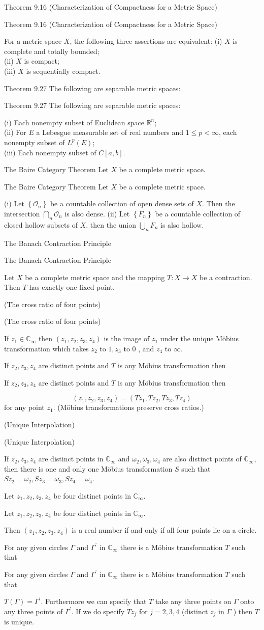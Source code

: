 \documentclass[17pt]{extarticle}
\newcommand{\boxset}[2]{\begin{mdframed}[style=darkQuesion]
#1
\end{mdframed}
\newpage
\begin{mdframed}[style=darkQuesion]
#1
  \end{mdframed}
\begin{mdframed}[style=darkAnswer]
#2
  \end{mdframed}
  \newpage
}
\begin{document}
\boxset{Theorem 9.16 (Characterization of Compactness for a Metric Space)}
{For a metric space $X$, the following three assertions are equivalent:
(i) $X$ is complete and totally bounded;\[\ \]
(ii) $X$ is compact;\[\ \]
(iii) $X$ is sequentially compact.\[\ \]
}%
\boxset{Theorem $9.27$ The following are separable metric spaces:}
{
(i) Each nonempty subset of Euclidean space $\mathbb{R}^{n}$;\[\ \]
(ii) For $E$ a Lebesgue measurable set of real numbers and $1 \leq p<\infty$, each nonempty subset of $L^{p}(E)$;\[\ \]
(iii) Each nonempty subset of $C[a, b]$.\[\ \]
}%
\boxset{The Baire Category Theorem Let $X$ be a complete metric space.}
{
(i) Let $\left\{\mathcal{O}_{n}\right\}$ be a countable collection of open dense sets of $X$. Then the intersection $\bigcap_{n} \mathcal{O}_{n}$ is also dense.
(ii) Let $\left\{F_{n}\right\}$ be a countable collection of closed hollow subsets of $X$. then the union $\bigcup_{n} F_{n}$ is also hollow.\[\ \]
}%
\boxset{The Banach Contraction Principle}
{Let $X$ be a complete metric space and the mapping $T: X \rightarrow X$ be a contraction. Then $T$ has exactly one fixed point.}%
\boxset{(The cross ratio of four points)}
{If $z_{1} \in \mathbb{C}_{\infty}$ then $\left(z_{1}, z_{2}, z_{3}, z_{4}\right)$ is the image of $z_{1}$ under the unique Möbius transformation which takes $z_{2}$ to $1, z_{3}$ to 0 , and $z_{4}$ to $\infty$.}%
\boxset{If $z_{2}, z_{3}, z_{4}$ are distinct points and $T$ is any Möbius transformation then}
{
\[
\left(z_{1}, z_{2}, z_{3}, z_{4}\right)=\left(T z_{1}, T z_{2}, T z_{3}, T z_{4}\right)
\]
for any point $z_{1}$. (Möbius transformations preserve cross ratios.)
}%
\boxset{(Unique Interpolation)}
{If $z_{2}, z_{3}, z_{4}$ are distinct points in $\mathbb{C}_{\infty}$ and $\omega_{2}, \omega_{3}, \omega_{4}$ are also distinct points of $\mathbb{C}_{\infty}$, then there is one and only one Möbius transformation $S$ such that $S z_{2}=\omega_{2}, S z_{3}=\omega_{3}, S z_{4}=\omega_{4}$.}%
\boxset{Let $z_{1}, z_{2}, z_{3}, z_{4}$ be four distinct points in $\mathbb{C}_{\infty}$.}
{Then $\left(z_{1}, z_{2}, z_{3}, z_{4}\right)$ is a real number if and only if all four points lie on a circle.}%
\boxset{For any given circles $\Gamma$ and $\Gamma^{\prime}$ in $\mathbb{C}_{\infty}$ there is a Möbius transformation $T$ such that}
{$T(\Gamma)=\Gamma^{\prime}$. Furthermore we can specify that $T$ take any three points on $\Gamma$ onto any three points of $\Gamma^{\prime}$. If we do specify $T z_{j}$ for $j=2,3,4$ (distinct $z_{j}$ in $\Gamma$ ) then $T$ is unique.}%
\end{document}
